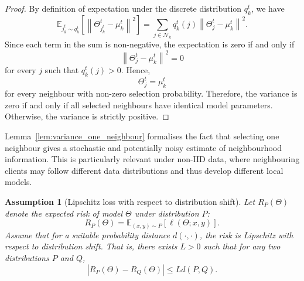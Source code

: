 \documentclass[conference]{IEEEtran}
\newtheorem{assumption}{Assumption}
\begin{document}
\begin{proof}
By definition of expectation under the discrete distribution $q_k^t$, we have
\begin{equation}
\mathbb{E}_{j_k^t\sim q_k^t}
\left[
\left\|
\Theta_{j_k^t}^t-\mu_k^t
\right\|^2
\right]
=
\sum_{j\in\mathcal{N}_k}
q_k^t(j)
\left\|
\Theta_j^t-\mu_k^t
\right\|^2.
    \label{eq:auto-046}
\end{equation}
Since each term in the sum is non-negative, the expectation is zero if and only if
\begin{equation}
\left\|
\Theta_j^t-\mu_k^t
\right\|^2=0
    \label{eq:auto-047}
\end{equation}
for every $j$ such that $q_k^t(j)>0$. Hence,
\begin{equation}
\Theta_j^t=\mu_k^t
    \label{eq:auto-048}
\end{equation}
for every neighbour with non-zero selection probability. Therefore, the variance is zero if and only if all selected neighbours have identical model parameters. Otherwise, the variance is strictly positive.
\end{proof}

Lemma~\ref{lem:variance_one_neighbour} formalises the fact that selecting one neighbour gives a stochastic and potentially noisy estimate of neighbourhood information. This is particularly relevant under non-IID data, where neighbouring clients may follow different data distributions and thus develop different local models.

\begin{assumption}[Lipschitz loss with respect to distribution shift]
\label{ass:lipschitz_distribution}
Let $R_P(\Theta)$ denote the expected risk of model $\Theta$ under distribution $P$:
\begin{equation}
R_P(\Theta)
=
\mathbb{E}_{(x,y)\sim P}
[
\ell(\Theta;x,y)
].
    \label{eq:auto-049}
\end{equation}
Assume that for a suitable probability distance $d(\cdot,\cdot)$, the risk is Lipschitz with respect to distribution shift. That is, there exists $L>0$ such that for any two distributions $P$ and $Q$,
\begin{equation}
|R_P(\Theta)-R_Q(\Theta)|
\leq
L d(P,Q).
    \label{eq:auto-050}
\end{equation}
\end{assumption}
\end{document}
